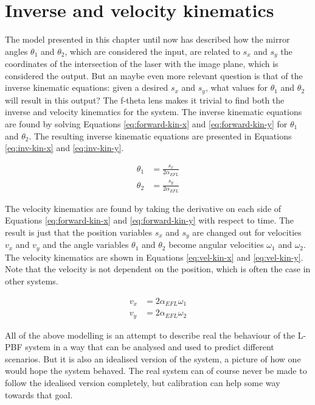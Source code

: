 \section{Inverse and velocity kinematics}
The model presented in this chapter until now has described how the mirror angles $\theta_1$ and $\theta_2$, which are considered the input, are related to $s_x$ and $s_y$ the coordinates of the intersection of the laser with the image plane, which is considered the output. But an maybe even more relevant question is that of the inverse kinematic equations: given a desired $s_x$ and $s_y$, what values for $\theta_1$ and $\theta_2$ will result in this output? The f-theta lens makes it trivial to find both the inverse and velocity kinematics for the system. The inverse kinematic equations are found by solving Equations \ref{eq:forward-kin-x} and \ref{eq:forward-kin-y} for $\theta_1$ and $\theta_2$. The resulting inverse kinematic equations are presented in Equations \ref{eq:inv-kin-x} and \ref{eq:inv-kin-y}. 

\begin{align}
    \theta_1 &= \frac{s_x}{2\alpha_{EFL}} \label{eq:inv-kin-x} \\
    \theta_2 &= \frac{s_y}{2\alpha_{EFL}} \label{eq:inv-kin-y}
\end{align}

The velocity kinematics are found by taking the derivative on each side of Equations \ref{eq:forward-kin-x} and \ref{eq:forward-kin-y} with respect to time. The result is just that the position variables $s_x$ and $s_y$ are changed out for velocities $v_x$ and $v_y$ and the angle variables $\theta_1$ and $\theta_2$ become angular velocities $\omega_1$ and $\omega_2$. The velocity kinematics are shown in Equations \ref{eq:vel-kin-x} and \ref{eq:vel-kin-y}. Note that the velocity is not dependent on the position, which is often the case in other systems.

\begin{align}
    v_x &= 2\alpha_{EFL} \omega_1 \label{eq:vel-kin-x}\\
    v_y &= 2\alpha_{EFL} \omega_2 \label{eq:vel-kin-y}
\end{align}

All of the above modelling is an attempt to describe real the behaviour of the L-PBF system in a way that can be analysed and used to predict different scenarios. But it is also an idealised version of the system, a picture of how one would hope the system behaved. The real system can of course never be made to follow the idealised version completely, but calibration can help some way towards that goal.
